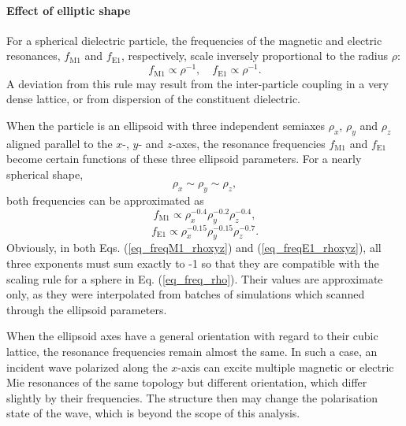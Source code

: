 
\paragraph{Effect of elliptic shape}%
For a spherical dielectric particle, the frequencies of the magnetic and electric resonances, $f_{\text{M1}}$ and $f_{\text{E1}}$, respectively, scale inversely proportional to the radius $\rho$:
\begin{equation} f_{\text{M1}} \propto \rho^{-1}, \quad f_{\text{E1}} \propto \rho^{-1}. \label{eq_freq_rho}\end{equation}
A deviation from this rule may result from the inter-particle coupling in a very dense lattice, or from dispersion of the constituent dielectric.

When the particle is an ellipsoid with three independent semiaxes $\rho_x$, $\rho_y$ and $\rho_z$ aligned parallel to the $x$-, $y$- and $z$-axes, the resonance frequencies $f_{\text{M1}}$ and $f_{\text{E1}}$ become certain functions of these three ellipsoid parameters. For a nearly spherical shape, 
$$\rho_x \sim \rho_y \sim \rho_z,$$
both frequencies can be approximated as 
\begin{equation}  f_{\text{M1}} \propto \rho_x^{-0.4}  \rho_y^{-0.2} \rho_z^{-0.4}, \label{eq_freqM1_rhoxyz}\end{equation}
\begin{equation}  f_{\text{E1}} \propto \rho_x^{-0.15}  \rho_y^{-0.15} \rho_z^{-0.7}. \label{eq_freqE1_rhoxyz}\end{equation}
Obviously,  in both Eqs. (\ref{eq_freqM1_rhoxyz}) and (\ref{eq_freqE1_rhoxyz}), all three exponents must sum exactly to -1 so that they are compatible with the scaling rule for a sphere in Eq. (\ref{eq_freq_rho}). Their values are approximate only, as they were interpolated from batches of simulations which scanned through the ellipsoid parameters.

When the ellipsoid axes have a general orientation with regard to their cubic lattice, the resonance frequencies remain almost the same. In such a case, an incident wave polarized along the $x$-axis can  excite multiple magnetic or electric Mie resonances of the same topology but different orientation, which differ slightly by their frequencies. The structure then may change the polarisation state of the wave, which is beyond the scope of this analysis.

